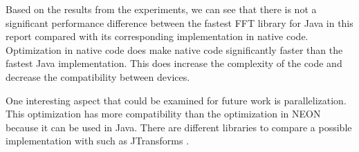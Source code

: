 Based on the results from the experiments, we can see that there is not a significant performance difference between the fastest FFT library for Java in this report compared with its corresponding implementation in native code. Optimization in native code does make native code significantly faster than the fastest Java implementation. This does increase the complexity of the code and decrease the compatibility between devices.

One interesting aspect that could be examined for future work is parallelization. This optimization has more compatibility than the optimization in NEON because it can be used in Java. There are different libraries to compare a possible implementation with such as JTransforms \cite{jtransforms:benchmark}.
